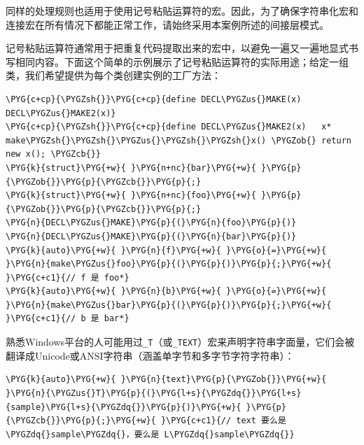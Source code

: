 
同样的处理规则也适用于使用记号粘贴运算符的宏。因此，为了确保字符串化宏和连接宏在所有情况下都能正常工作，请始终采用本案例所述的间接层模式。



记号粘贴运算符通常用于把重复代码提取出来的宏中，以避免一遍又一遍地显式书写相同内容。下面这个简单的示例展示了记号粘贴运算符的实际用途；给定一组类，我们希望提供为每个类创建实例的工厂方法：



\begin{codeblockbg}
\begin{Verbatim}[commandchars=\\\{\},breaklines=true,breakanywhere=true,fontsize=\codefont,xleftmargin=17bp]
\PYG{c+cp}{\PYGZsh{}}\PYG{c+cp}{define DECL\PYGZus{}MAKE(x)    DECL\PYGZus{}MAKE2(x)}
\PYG{c+cp}{\PYGZsh{}}\PYG{c+cp}{define DECL\PYGZus{}MAKE2(x)   x* make\PYGZsh{}\PYGZsh{}\PYGZus{}\PYGZsh{}\PYGZsh{}x() \PYGZob{} return new x(); \PYGZcb{}}
\PYG{k}{struct}\PYG{+w}{ }\PYG{n+nc}{bar}\PYG{+w}{ }\PYG{p}{\PYGZob{}}\PYG{p}{\PYGZcb{}}\PYG{p}{;}
\PYG{k}{struct}\PYG{+w}{ }\PYG{n+nc}{foo}\PYG{+w}{ }\PYG{p}{\PYGZob{}}\PYG{p}{\PYGZcb{}}\PYG{p}{;}
\PYG{n}{DECL\PYGZus{}MAKE}\PYG{p}{(}\PYG{n}{foo}\PYG{p}{)}
\PYG{n}{DECL\PYGZus{}MAKE}\PYG{p}{(}\PYG{n}{bar}\PYG{p}{)}
\PYG{k}{auto}\PYG{+w}{ }\PYG{n}{f}\PYG{+w}{ }\PYG{o}{=}\PYG{+w}{ }\PYG{n}{make\PYGZus{}foo}\PYG{p}{(}\PYG{p}{)}\PYG{p}{;}\PYG{+w}{ }\PYG{c+c1}{// f 是 foo*}
\PYG{k}{auto}\PYG{+w}{ }\PYG{n}{b}\PYG{+w}{ }\PYG{o}{=}\PYG{+w}{ }\PYG{n}{make\PYGZus{}bar}\PYG{p}{(}\PYG{p}{)}\PYG{p}{;}\PYG{+w}{ }\PYG{c+c1}{// b 是 bar*}
\end{Verbatim}
\end{codeblockbg}



熟悉Windows平台的人可能用过\texttt{\_\allowbreak{}T}（或\texttt{\_\allowbreak{}TEXT}）宏来声明字符串字面量，它们会被翻译成Unicode或ANSI字符串（涵盖单字节和多字节字符字符串）：



\begin{codeblockbg}
\begin{Verbatim}[commandchars=\\\{\},breaklines=true,breakanywhere=true,fontsize=\codefont,xleftmargin=17bp]
\PYG{k}{auto}\PYG{+w}{ }\PYG{n}{text}\PYG{p}{\PYGZob{}}\PYG{+w}{ }\PYG{n}{\PYGZus{}T}\PYG{p}{(}\PYG{l+s}{\PYGZdq{}}\PYG{l+s}{sample}\PYG{l+s}{\PYGZdq{}}\PYG{p}{)}\PYG{+w}{ }\PYG{p}{\PYGZcb{}}\PYG{p}{;}\PYG{+w}{ }\PYG{c+c1}{// text 要么是 \PYGZdq{}sample\PYGZdq{}，要么是 L\PYGZdq{}sample\PYGZdq{}}
\end{Verbatim}
\end{codeblockbg}


